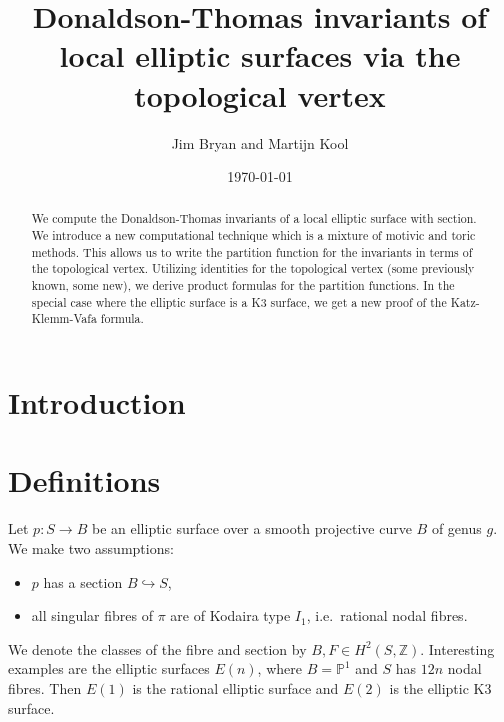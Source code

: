 \documentclass{amsart}
\title{Donaldson-Thomas invariants of local elliptic surfaces via the topological vertex}
\author{Jim Bryan and Martijn Kool}
\date{\today}
\theoremstyle{definition}
\newcommand{\ZZ} {\mathbb{Z}}		%
\newcommand{\PP} {\mathbb{P}}
\begin{document}
\begin{abstract}

We compute the Donaldson-Thomas invariants of a local elliptic surface
with section. We introduce a new computational technique which is a
mixture of motivic and toric methods. This allows us to write the
partition function for the invariants in terms of the topological
vertex. Utilizing identities for the topological vertex (some
previously known, some new), we derive product formulas for the
partition functions. In the special case where the elliptic surface is
a K3 surface, we get a new proof of the Katz-Klemm-Vafa formula.
\end{abstract}

\maketitle 





\section{Introduction}

\section{Definitions}

Let $p : S \rightarrow B$ be an elliptic surface over a smooth projective curve $B$ of genus $g$. We make two assumptions:
\begin{itemize}
\item $p$ has a section $B \hookrightarrow S$,
\item all singular fibres of $\pi$ are of Kodaira type $I_1$, i.e.~rational nodal fibres. 
\end{itemize}
We denote the classes of the fibre and section by $B, F \in H^2(S,\ZZ)$. Interesting examples are the elliptic surfaces $E(n)$, where $B = \PP^1$ and $S$ has $12n$ nodal fibres. Then $E(1)$ is the rational elliptic surface and $E(2)$ is the elliptic K3 surface.
\end{document}
